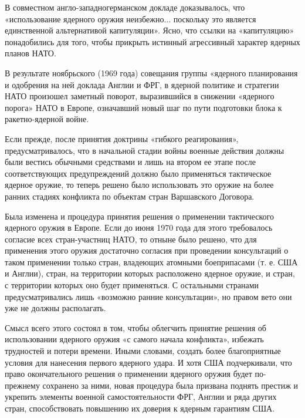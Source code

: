 \documentclass[12pt, a4paper, openany]{book}
\begin{document}
	В совместном англо-западногерманском докладе доказывалось, что «использование ядерного оружия неизбежно... поскольку это является единственной альтернативой капитуляции». Ясно, что ссылки на «капитуляцию» понадобились для того, чтобы прикрыть истинный агрессивный характер ядерных планов НАТО.
	
	В результате ноябрьского (1969 года) совещания группы «ядерного планирования и одобрения на ней доклада Англии и ФРГ, в ядерной политике и стратегии НАТО произошел заметный поворот, выразившийся в снижении «ядерного порога» НАТО в Европе, означавший новый шаг по пути подготовки блока к ракетно-ядерной войне.
	
	Если прежде, после принятия доктрины «гибкого реагирования», предусматривалось, что в начальной стадии войны военные действия должны были вестись обычными средствами и лишь на втором ее этапе после соответствующих предупреждений должно было применяться тактическое ядерное оружие, то теперь решено было использовать это оружие на более ранних стадиях конфликта по объектам стран Варшавского Договора.
	
	Была изменена и процедура принятия решения о применении тактического ядерного оружия в Европе. Если до июня 1970 года для этого требовалось согласие всех стран-участниц НАТО, то отныне было решено, что для применения этого оружия достаточно согласия при проведении консультаций о таком применении только стран, владеющих атомными боеприпасами (т. е. США и Англии), стран, на территории которых расположено ядерное оружие, и стран, с территории которых оно будет применяться. С остальными странами предусматривались лишь «возможно ранние консультации», но правом вето они уже не должны располагать.
	
	Смысл всего этого состоял в том, чтобы облегчить принятие решения об использовании ядерного оружия «с самого начала конфликта», избежать трудностей и потери времени. Иными словами, создать более благоприятные условия для нанесения первого ядерного удара. И хотя США подчеркивали, что право окончательного решения о применении ядерного оружия будет по-прежнему сохранено за ними, новая процедура была призвана поднять престиж и укрепить элементы военной самостоятельности ФРГ, Англии и ряда других стран, способствовать повышению их доверия к ядерным гарантиям США.
	
\end{document}

